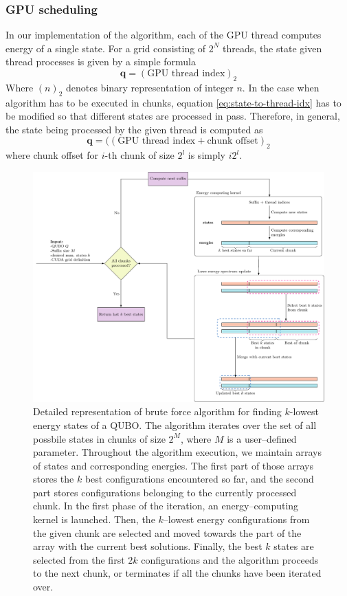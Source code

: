 \subsubsection{GPU scheduling}
In our implementation of the algorithm, each of the GPU thread computes energy
of a single state. For a grid consisting of $2^N$ threads, the state given
thread processes is given by a simple formula
\begin{equation}
  \label{eq:state-to-thread-idx}
  \mathbf{q} = (\mbox{GPU thread index})_2
\end{equation}
Where $(n)_2$ denotes binary representation of integer $n$. In the case when algorithm has to be executed in chunks, equation \eqref{eq:state-to-thread-idx} has to be modified so that different states are processed in pass. Therefore, in general, the state being processed by the given thread is computed as
\begin{equation}
  \mathbf{q} = ((\mbox{GPU thread index} + \mbox{chunk offset})_2
\end{equation}
where chunk offset for $i$-th chunk of size $2^l$ is simply $i2^l$.

\begin{figure}
  \includegraphics[width=\textwidth]{figures/bruteforce}
  \caption{
    Detailed representation of brute force algorithm for finding $k$-lowest energy states of a QUBO.
    The algorithm iterates over the set of all possbile states in chunks of size $2^{M}$, where $M$
    is a user--defined parameter. Throughout the algorithm execution, we maintain arrays of states and
    corresponding energies. The first part of those arrays stores the $k$ best configurations
    encountered so far, and the second part stores configurations belonging to the currently processed chunk.
    In the first phase of the iteration, an energy--computing kernel is launched. Then, the $k$--lowest energy
    configurations from the given chunk are selected and moved towards the part of the array with the current
    best solutions. Finally, the best $k$ states are selected from the
    first $2k$ configurations and the
    algorithm proceeds to the next chunk, or terminates if all the chunks have been iterated over.
  }
  \label{fig:bruteforce}
\end{figure}

